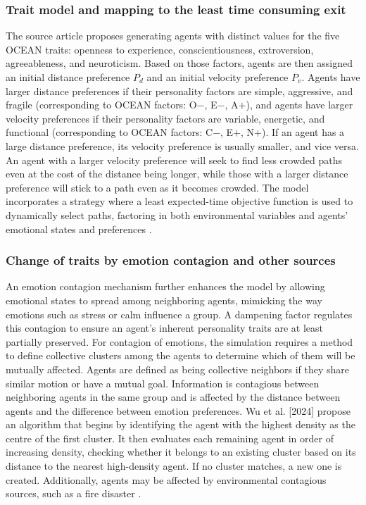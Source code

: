 \documentclass[9pt]{pnas-new}
\begin{document}
\subsubsection{Trait model and mapping to the least time consuming exit}
The source article proposes generating agents with distinct values for the five OCEAN traits: openness to experience, conscientiousness, extroversion, agreeableness, and neuroticism. Based on those factors, agents are then assigned an initial distance preference ${P_d}$ and an initial velocity preference ${P_v}$. Agents have larger distance preferences if their personality factors are simple, aggressive, and fragile (corresponding to OCEAN factors: O${-}$, E${-}$, A${+}$), and agents have larger velocity preferences if their personality factors are variable, energetic, and functional (corresponding to OCEAN factors: C${-}$, E${+}$, N${+}$). If an agent has a large distance preference, its velocity preference is usually smaller, and vice versa. An agent with a larger velocity preference will seek to find less crowded paths even at the cost of the distance being longer, while those with a larger distance preference will stick to a path even as it becomes crowded. The model incorporates a strategy where a least expected-time objective function is used to dynamically select paths, factoring in both environmental variables and agents’ emotional states and preferences \cite{Wu_Huang_Tian_Yan_Yu_2024}.

\subsubsection{Change of traits by emotion contagion and other sources}
An emotion contagion mechanism further enhances the model by allowing emotional states to spread among neighboring agents, mimicking the way emotions such as stress or calm influence a group. A dampening factor regulates this contagion to ensure an agent's inherent personality traits are at least partially preserved. For contagion of emotions, the simulation requires a method to define collective clusters among the agents to determine which of them will be mutually affected. Agents are defined as being collective neighbors if they share similar motion or have a mutual goal. Information is contagious between neighboring agents in the same group and is affected by the distance between agents and the difference between emotion preferences. Wu et al. [2024] propose an algorithm that begins by identifying the agent with the highest density as the centre of the first cluster. It then evaluates each remaining agent in order of increasing density, checking whether it belongs to an existing cluster based on its distance to the nearest high-density agent. If no cluster matches, a new one is created. Additionally, agents may be affected by environmental contagious sources, such as a fire disaster \cite{Wu_Huang_Tian_Yan_Yu_2024}.  
\end{document}
